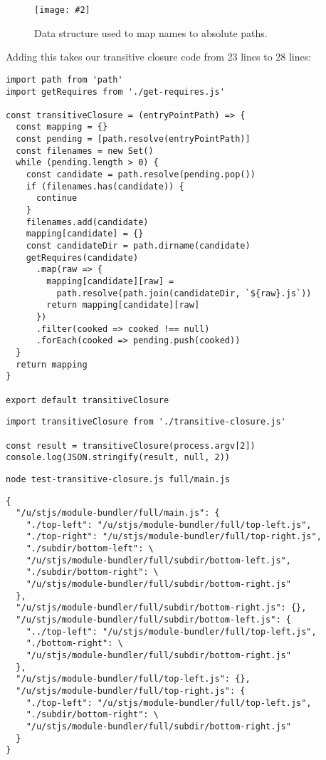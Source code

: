\documentclass[krantzl]{krantz}
\newcommand{\figpdf}[4]{\begin{figure}%
\centering%
\texttt{[image: \#2]}%
\caption{#3}%
\label{#1}%
\end{figure}}
\begin{document}
\figpdf{module-bundler-structure}{./module-bundler/structure.pdf}{Data structure used to map names to absolute paths.}{0.6}


Adding this takes our transitive closure code from
23 lines
to 28 lines:


\begin{lstlisting}[frame=tblr]
import path from 'path'
import getRequires from './get-requires.js'

const transitiveClosure = (entryPointPath) => {
  const mapping = {}
  const pending = [path.resolve(entryPointPath)]
  const filenames = new Set()
  while (pending.length > 0) {
    const candidate = path.resolve(pending.pop())
    if (filenames.has(candidate)) {
      continue
    }
    filenames.add(candidate)
    mapping[candidate] = {}
    const candidateDir = path.dirname(candidate)
    getRequires(candidate)
      .map(raw => {
        mapping[candidate][raw] =
          path.resolve(path.join(candidateDir, `${raw}.js`))
        return mapping[candidate][raw]
      })
      .filter(cooked => cooked !== null)
      .forEach(cooked => pending.push(cooked))
  }
  return mapping
}

export default transitiveClosure
\end{lstlisting}



\begin{lstlisting}[frame=tblr]
import transitiveClosure from './transitive-closure.js'

const result = transitiveClosure(process.argv[2])
console.log(JSON.stringify(result, null, 2))
\end{lstlisting}



\begin{lstlisting}[frame=shadowbox]
node test-transitive-closure.js full/main.js
\end{lstlisting}



\begin{lstlisting}[frame=tblr,backgroundcolor=\color{black!5}]
{
  "/u/stjs/module-bundler/full/main.js": {
    "./top-left": "/u/stjs/module-bundler/full/top-left.js",
    "./top-right": "/u/stjs/module-bundler/full/top-right.js",
    "./subdir/bottom-left": \
    "/u/stjs/module-bundler/full/subdir/bottom-left.js",
    "./subdir/bottom-right": \
    "/u/stjs/module-bundler/full/subdir/bottom-right.js"
  },
  "/u/stjs/module-bundler/full/subdir/bottom-right.js": {},
  "/u/stjs/module-bundler/full/subdir/bottom-left.js": {
    "../top-left": "/u/stjs/module-bundler/full/top-left.js",
    "./bottom-right": \
    "/u/stjs/module-bundler/full/subdir/bottom-right.js"
  },
  "/u/stjs/module-bundler/full/top-left.js": {},
  "/u/stjs/module-bundler/full/top-right.js": {
    "./top-left": "/u/stjs/module-bundler/full/top-left.js",
    "./subdir/bottom-right": \
    "/u/stjs/module-bundler/full/subdir/bottom-right.js"
  }
}
\end{lstlisting}
\end{document}
